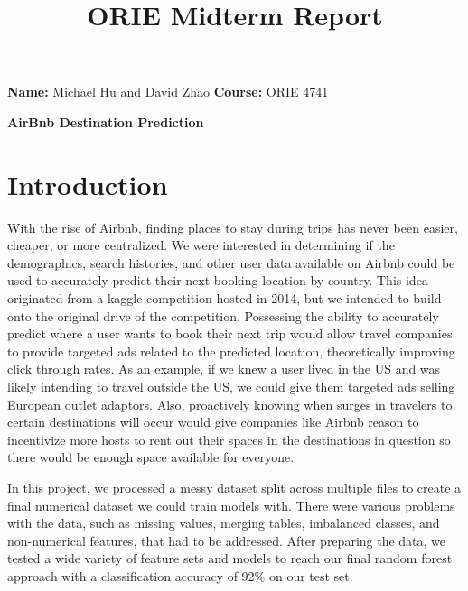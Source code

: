 \documentclass[a4paper, 11pt]{article}
\begin{document}
\noindent\textbf{Name:} Michael Hu and David Zhao \hfill \textbf{Course:} ORIE 4741 \\ 
\begin{center}
\title{ORIE Midterm Report}
\LARGE \bf AirBnb Destination Prediction
\end{center}

\section*{Introduction}
\par
With the rise of Airbnb, finding places to stay during trips has never been easier, cheaper, or more centralized. We were interested in determining if the demographics, search histories, and other user data available on Airbnb could be used to accurately predict their next booking location by country. This idea originated from a kaggle competition hosted in 2014, but we intended to build onto the original drive of the competition. Possessing the ability to accurately predict where a user wants to book their next trip would allow travel companies to provide targeted ads related to the predicted location, theoretically improving click through rates. As an example, if we knew a user lived in the US and was likely intending to travel outside the US, we could give them targeted ads selling European outlet adaptors. Also, proactively knowing when surges in travelers to certain destinations will occur would give companies like Airbnb reason to incentivize more hosts to rent out their spaces in the destinations in question so there would be enough space available for everyone.
\par
In this project, we processed a messy dataset split across multiple files to create a final numerical dataset we could train models with. There were various problems with the data, such as missing values, merging tables, imbalanced classes, and non-numerical features, that had to be addressed. After preparing the data, we tested a wide variety of feature sets and models to reach our final random forest approach with a classification accuracy of 92\% on our test set.
\end{document}
